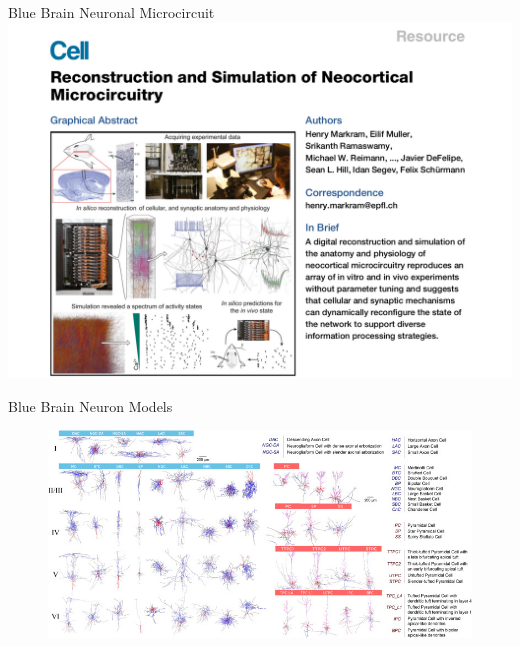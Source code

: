 \documentclass{beamer}
\begin{document}
\begin{frame}{Blue Brain Neuronal Microcircuit}
    \centering
    \includegraphics[width=\textwidth]{images/markram_front.png}
\end{frame}

\begin{frame}{Blue Brain Neuron Models}
    \begin{figure}
        \centering
        \includegraphics[width=\textwidth]{images/m-types.jpg}\\
    \end{figure}
\end{frame}
\end{document}
